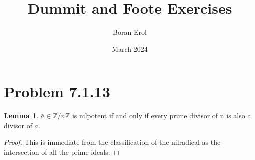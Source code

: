 \documentclass{article}
\title{Dummit and Foote Exercises}
\date{March 2024}
\author{Boran Erol}
\theoremstyle{definition}
\newtheorem{lemma}[theorem]{Lemma}
\newcommand{\Z}{\mathbb{Z}}
\begin{document}
\maketitle

\section{Problem 7.1.13}

\begin{lemma}
    $\bar{a} \in \Z /n\Z$ is nilpotent if and only if
    every prime divisor of n is also a divisor of $a$.
\end{lemma}
\begin{proof}
    This is immediate from the classification of the nilradical
    as the intersection of all the prime ideals.
\end{proof}
\end{document}
